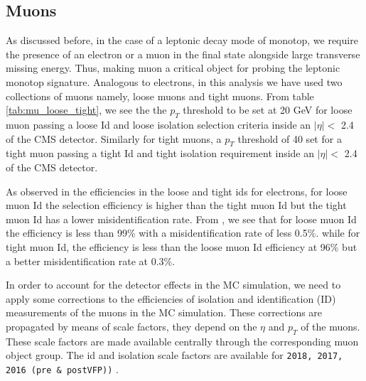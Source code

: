 \subsection{Muons}
As discussed before, in the case of a leptonic decay mode of monotop, we require the presence of an electron or a muon in the final state alongside large transverse missing energy. Thus, making muon a critical object for probing the leptonic monotop signature. Analogous to electrons, in this analysis we have used two collections of muons namely, loose muons and tight muons. 
From table \ref{tab:mu_loose_tight}, we see the the $p_{T}$ threshold to be set at 20 GeV for loose muon passing a loose Id and loose isolation selection criteria inside an $|\eta| <$ 2.4 of the CMS detector. Similarly for tight muons, a $p_{T}$ threshold of 40 set for a tight muon passing a tight Id and tight isolation requirement inside an $|\eta| <$ 2.4 of the CMS detector. 

As observed in the efficiencies in the loose and tight ids for electrons, for loose muon Id the selection efficiency is higher than the tight muon Id but the tight muon Id has a lower misidentification rate. From \cite{muidiso}, we see that for loose muon Id the efficiency is less than 99\% with a misidentification rate of less 0.5\%. while for tight muon Id, the efficiency is less than the loose muon Id efficiency at  96\% but a better misidentification rate at 0.3\%.

In order to account for the detector effects in the MC simulation, we need to apply some corrections to the efficiencies of isolation and identification (ID) measurements of the muons in the MC simulation. These corrections are propagated by means of scale factors, they depend on the $\eta$ and $p_{T}$ of the muons. These scale factors are made available centrally through the corresponding muon object group. The id and isolation scale factors are available for \verb|2018, 2017, 2016 (pre & postVFP))| \cite{muidisotwiki}.
\begin{table}
\centering
\caption{Loose and Tight muon selection criteria used}
\vspace{3mm}
\label{tab:mu_loose_tight}
\end{table}

